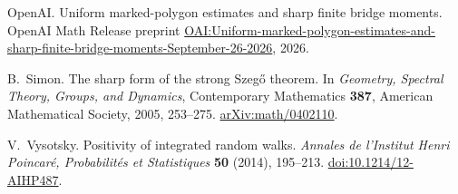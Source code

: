 OpenAI.
Uniform marked-polygon estimates and sharp finite bridge moments.
OpenAI Math Release preprint
\href{https://github.com/openai/math/blob/main/preprints/Uniform-marked-polygon-estimates-and-sharp-finite-bridge-moments-September-26-2026/main.pdf}{OAI:Uniform-marked-polygon-estimates-and-sharp-finite-bridge-moments-September-26-2026},
2026.

B.~Simon. The sharp form of the strong Szeg\H{o} theorem.
In \emph{Geometry, Spectral Theory, Groups, and Dynamics},
Contemporary Mathematics \textbf{387}, American Mathematical Society,
2005, 253--275. \href{https://arxiv.org/abs/math/0402110}{arXiv:math/0402110}.

V.~Vysotsky. Positivity of integrated random walks.
\emph{Annales de l'Institut Henri Poincar\'e, Probabilit\'es et Statistiques}
\textbf{50} (2014), 195--213.
\href{https://doi.org/10.1214/12-AIHP487}{doi:10.1214/12-AIHP487}.
